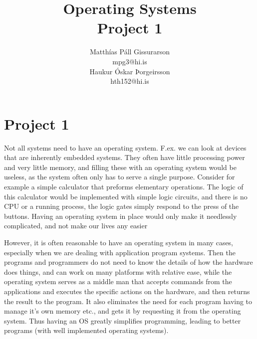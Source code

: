 \documentclass[12pt]{article}
\title{Operating Systems\\
Project 1}
\author{Matthías Páll Gissurarson \\mpg3@hi.is\\
Haukur Óskar Þorgeirsson\\hth152@hi.is}
\begin{document}
\maketitle
\section{Project 1}
Not all systems need to have an operating system. F.ex. we can look at devices that are inherently embedded systems. They often have little processing power and very little memory, and filling these with an operating system would be useless, as the system often only has to serve a single purpose.
Consider for example a simple calculator that preforms elementary operations.
The logic of this calculator would be implemented with simple logic circuits, and there is no CPU or a running process, the logic gates simply respond to the press of the buttons. Having an operating system in place would only make it needlessly complicated, and not make our lives any easier

However, it is often reasonable to have an operating system in many cases, especially when we are dealing with application program systems. Then the programs and programmers do not need to know the details of how the hardware does things, and can work on many platforms with relative ease, while the operating system serves as a middle man that accepts commands from the applications and executes the specific actions on the hardware, and then returns the result to the program. It also eliminates the need for each program having to manage it's own memory etc., and gets it by requesting it from the operating system. Thus having an OS greatly simplifies programming, leading to better programs (with well implemented operating systems).
\end{document}
